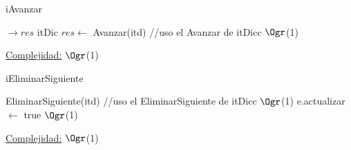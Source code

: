 \begin{Representacion}
\begin{Algoritmos}
	\begin{algorithm}[H]
		\caption{iAvanzar}
		
		\begin{algorithmic}[1]
			 $\to res$ itDic
			\State $res \leftarrow$ Avanzar(itd) //uso el Avanzar de itDicc \Comment $\Ogr$(1)
			\EndProcedure 
		\end{algorithmic}
		\underline{Complejidad:} $\Ogr$(1)
	\end{algorithm}
	
	\begin{algorithm}[H]
		\caption{iEliminarSiguiente}
		
		\begin{algorithmic}[1]
			\State EliminarSiguiente(itd) //uso el EliminarSiguiente de itDicc \Comment $\Ogr$(1)
			\State e.actualizar $\leftarrow$ true \Comment $\Ogr$(1)
			\EndProcedure 
		\end{algorithmic}
		\underline{Complejidad:} $\Ogr$(1)
	\end{algorithm}	
	
\end{Algoritmos}
\end{Representacion}